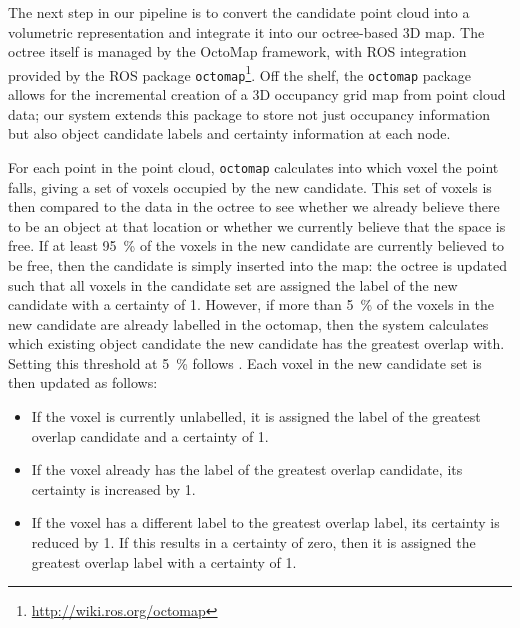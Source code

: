 The next step in our pipeline is to convert the candidate point cloud into a volumetric representation and integrate it into our octree-based 3D map.
The octree itself is managed by the OctoMap framework\cite{hornung13octomap}, with ROS integration provided by the ROS package \texttt{octomap}\footnote{\url{http://wiki.ros.org/octomap}}.
Off the shelf, the \texttt{octomap} package allows for the incremental creation of a 3D occupancy grid map from point cloud data; our system extends this package to store not just occupancy information but also object candidate labels and certainty information at each node.


For each point in the point cloud, \texttt{octomap} calculates into which voxel the point falls, giving a set of voxels occupied by the new candidate.
This set of voxels is then compared to the data in the octree to see whether we already believe there to be an object at that location or whether we currently believe that the space is free.
If at least \SI{95}{\percent} of the voxels in the new candidate are currently believed to be free, then the candidate is simply inserted into the map: the octree is updated such that all voxels in the candidate set are assigned the label of the new candidate with a certainty of \num{1}.
However, if more than \SI{5}{\percent} of the voxels in the new candidate are already labelled in the octomap, then the system calculates which existing object candidate the new candidate has the greatest overlap with.
Setting this threshold at \SI{5}{\percent} follows \cite{garcia2013computational}.
Each voxel in the new candidate set is then updated as follows:

\begin{itemize}
	\item If the voxel is currently unlabelled, it is assigned the label of the greatest overlap candidate and a certainty of \num{1}.
	\item If the voxel already has the label of the greatest overlap candidate, its certainty is increased by \num{1}.
	\item If the voxel has a different label to the greatest overlap label, its certainty is reduced by \num{1}. If this results in a certainty of zero, then it is assigned the greatest overlap label with a certainty of \num{1}.
\end{itemize}
